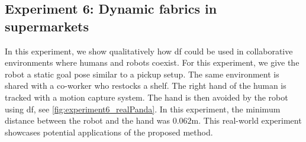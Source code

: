 \subsection{Experiment 6: Dynamic fabrics in supermarkets}%
\label{sub:experemint_6_dynamic_fabrics_in_supermarkets}
%
In this experiment, we show qualitatively how \ac{df} could be used in
collaborative environments where humans and robots coexist. For this
experiment, we give the robot a static goal pose similar to a pickup setup. The
same environment is shared with a co-worker who restocks a shelf. The right
hand of the human is tracked with a motion capture system.
The hand is then avoided by the robot using \ac{df}, see
\cref{fig:experiment6_realPanda}. In this experiment, the minimum distance
between the robot and the hand was $0.062$m. This real-world experiment
showcases potential applications of the proposed method.
